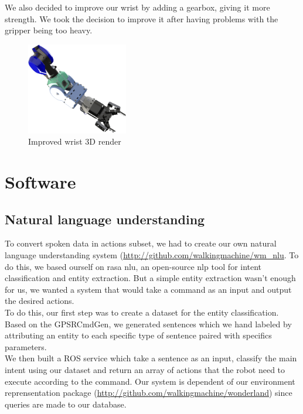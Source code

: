 \documentclass[runningheads,a4paper]{llncs}
\begin{document}
We also decided to improve our wrist by adding a gearbox, giving it more strength. We took the decision to improve it after having problems with the gripper being too heavy.  

\begin{figure}
  \centering
  \includegraphics[width=125pt]{images/wrist.png}
  \caption{Improved wrist 3D render}
\end{figure} 

\newpage
\section{Software}

\subsection{Natural language understanding}
\tab To convert spoken data in actions subset, we had to create our own natural language understanding system (\href{http://github.com/walkingmachine/wm\_nlu}{http://github.com/walkingmachine/wm\_nlu}. To do this, we based ourself on rasa nlu\cite{rasa}, an open-source nlp tool for intent classification and entity extraction. But a simple entity extraction wasn't enough for us, we wanted a system that would take a command as an input and output the desired actions.\\

To do this, our first step was to create a dataset for the entity classification. Based on the GPSRCmdGen, we generated sentences which we hand labeled by attributing an entity to each specific type of sentence paired with specifics parameters.\\

We then built a ROS service which take a sentence as an input, classify the main intent using our dataset and return an array of actions that the robot need to execute according to the command. Our system is dependent of our environment reprensentation package (\href{http://github.com/walkingmachine/wonderland}{http://github.com/walkingmachine/wonderland}) since queries are made to our database.
\end{document}
